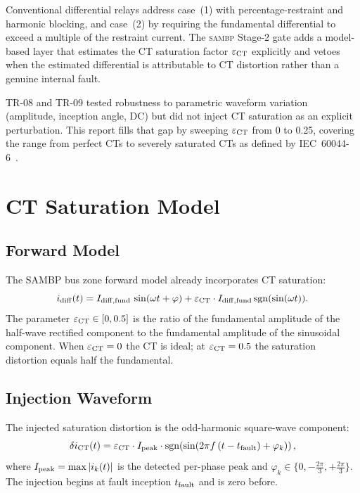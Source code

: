 \documentclass[12pt,a4paper]{article}
\newcommand{\SAMBP}{\textsc{sambp}}
\newcommand{\epsct}{\varepsilon_{\rm CT}}
\begin{document}
Conventional differential relays address case~(1) with percentage-restraint
and harmonic blocking, and case~(2) by requiring the fundamental differential
to exceed a multiple of the restraint current.  The \SAMBP{} Stage-2
gate adds a model-based layer that estimates the CT saturation factor
$\epsct$ explicitly and vetoes when the estimated differential is
attributable to CT distortion rather than a genuine internal fault.

TR-08 and TR-09 tested robustness to parametric waveform variation (amplitude,
inception angle, DC) but did not inject CT saturation as an explicit
perturbation.  This report fills that gap by sweeping $\epsct$ from 0 to 0.25,
covering the range from perfect CTs to severely saturated CTs as defined
by IEC~60044-6~\citep{IEC60044}.

\section{CT Saturation Model}

\subsection{Forward Model}

The SAMBP bus zone forward model already incorporates CT saturation:
\begin{equation}
  i_{\rm diff}(t) = I_{\rm diff,fund}\,\sin(\omega t + \varphi)
    + \epsct \cdot I_{\rm diff,fund}\,\mathrm{sgn}(\sin(\omega t)).
  \label{eq:model}
\end{equation}
The parameter $\epsct \in [0, 0.5]$ is the ratio of the fundamental
amplitude of the half-wave rectified component to the fundamental amplitude
of the sinusoidal component.  When $\epsct = 0$ the CT is ideal; at
$\epsct = 0.5$ the saturation distortion equals half the fundamental.

\subsection{Injection Waveform}

The injected saturation distortion is the odd-harmonic square-wave component:
\begin{equation}
  \delta i_{\rm CT}(t) =
    \epsct \cdot I_{\rm peak} \cdot \mathrm{sgn}\!\left(\sin(2\pi f\,(t - t_{\rm fault}) + \varphi_k)\right),
  \label{eq:inject}
\end{equation}
where $I_{\rm peak} = \max|i_k(t)|$ is the detected per-phase peak and
$\varphi_k \in \{0, -\tfrac{2\pi}{3}, +\tfrac{2\pi}{3}\}$.  The injection
begins at fault inception $t_{\rm fault}$ and is zero before.
\end{document}
